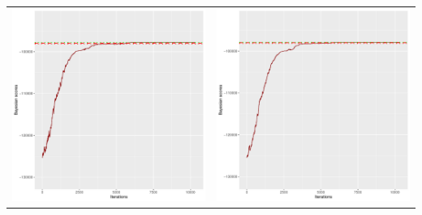 \documentclass[]{scrartcl}
\begin{document}
\begin{table}[h!]
\begin{tabular}{cc}
\includegraphics[scale = 0.4]{./figs/hepar2/v1/25/bayBoundsEvolution-10352.pdf} & 
\includegraphics[scale = 0.4]{./figs/hepar2/v1/50/bayBoundsEvolution-10352.pdf} \\

\end{tabular}
\end{table}
\end{document}
